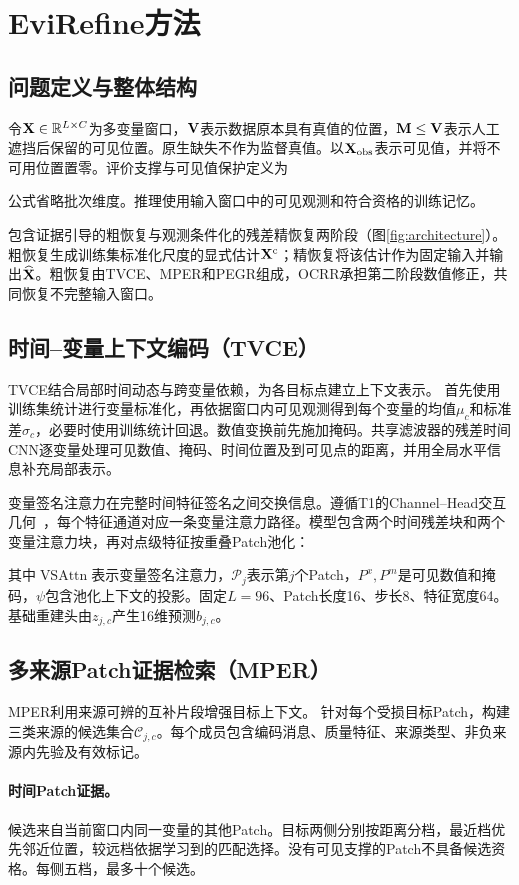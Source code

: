 \section{EviRefine方法}\label{sec:method}
\subsection{问题定义与整体结构}
令$\mathbf{X}\in\mathbb R^{L\times C}$为多变量窗口，$\mathbf{V}$表示数据原本具有真值的位置，$\mathbf{M}\leq\mathbf{V}$表示人工遮挡后保留的可见位置。原生缺失不作为监督真值。以$\mathbf{X}_{\rm obs}$表示可见值，并将不可用位置置零。评价支撑与可见值保护定义为

公式省略批次维度。推理使用输入窗口中的可见观测和符合资格的训练记忆。

\Model{}包含证据引导的粗恢复与观测条件化的残差精恢复两阶段（图\ref{fig:architecture}）。粗恢复生成训练集标准化尺度的显式估计$\mathbf{X}^{\rm c}$；精恢复将该估计作为固定输入并输出$\widehat{\mathbf{X}}$。粗恢复由TVCE、MPER和PEGR组成，OCRR承担第二阶段数值修正，共同恢复不完整输入窗口。

\subsection{时间--变量上下文编码（TVCE）}\label{sec:tvce}
TVCE结合局部时间动态与跨变量依赖，为各目标点建立上下文表示。
首先使用训练集统计进行变量标准化，再依据窗口内可见观测得到每个变量的均值$\mu_c$和标准差$\sigma_c$，必要时使用训练统计回退。数值变换前先施加掩码。共享滤波器的残差时间CNN逐变量处理可见数值、掩码、时间位置及到可见点的距离，并用全局水平信息补充局部表示。

变量签名注意力在完整时间特征签名之间交换信息。遵循T1的Channel--Head交互几何~\cite{t1}，每个特征通道对应一条变量注意力路径。模型包含两个时间残差块和两个变量注意力块，再对点级特征按重叠Patch池化：

其中$\operatorname{VSAttn}$表示变量签名注意力，$\mathcal P_j$表示第$j$个Patch，$P^x,P^m$是可见数值和掩码，$\psi$包含池化上下文的投影。固定$L=96$、Patch长度16、步长8、特征宽度64。基础重建头由$z_{j,c}$产生16维预测$b_{j,c}$。

\subsection{多来源Patch证据检索（MPER）}\label{sec:mper}
MPER利用来源可辨的互补片段增强目标上下文。
针对每个受损目标Patch，构建三类来源的候选集合$\mathcal C_{j,c}$。每个成员包含编码消息、质量特征、来源类型、非负来源内先验及有效标记。

\paragraph{时间Patch证据。}
候选来自当前窗口内同一变量的其他Patch。目标两侧分别按距离分档，最近档优先邻近位置，较远档依据学习到的匹配选择。没有可见支撑的Patch不具备候选资格。每侧五档，最多十个候选。


